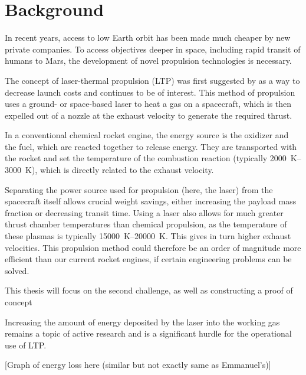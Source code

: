 \chapter{Background} \label{chp:background}

    In recent years, access to low Earth orbit has been made much cheaper by new private companies. To access objectives deeper in space, including rapid transit of humans to Mars, the development of novel propulsion technologies is necessary. 
    
    The concept of laser-thermal propulsion (LTP) was first suggested by \textcite{kantrowitzRelevanceSpace1971} as a way to decrease launch costs and continues to be of interest. This method of propulsion uses a ground- or space-based laser to heat a gas on a spacecraft, which is then expelled out of a nozzle at the exhaust velocity to generate the required thrust.

    In a conventional chemical rocket engine, the energy source is the oxidizer and the fuel, which are reacted together to release energy. They are transported with the rocket and set the temperature of the combustion reaction (typically \qtyrange{2000}{3000}{K}), which is directly related to the exhaust velocity.
    
    Separating the power source used for propulsion (here, the laser) from the spacecraft itself allows crucial weight savings, either increasing the payload mass fraction or decreasing transit time. Using a laser also allows for much greater thrust chamber temperatures than chemical propulsion, as the temperature of these plasmas is typically \qtyrange{15000}{20000}{K}. This gives in turn higher exhaust velocities. This propulsion method could therefore be an order of magnitude more efficient than our current rocket engines, if certain engineering problems can be solved.


    This thesis will focus on the second challenge, as well as constructing a proof of concept 
    

    Increasing the amount of energy deposited by the laser into the working gas remains a topic of active research and is a significant hurdle for the operational use of LTP.

        [Graph of energy loss here (similar but not exactly same as Emmanuel's)]

